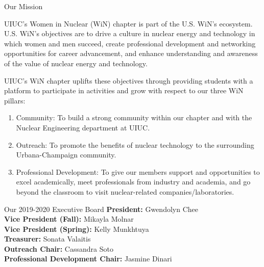\documentclass{resume2} %
\begin{document}
\begin{rSection}{Our Mission}
\raggedright
UIUC's Women in Nuclear (WiN) chapter is part of the
U.S. WiN's ecosystem. U.S. WiN's objectives are to
drive a culture in nuclear energy and technology
in which women and men succeed, create professional development
and networking opportunities for career advancement, and enhance understanding
and awareness of the value of nuclear energy and technology.

UIUC's WiN chapter uplifts these objectives through
providing students with a platform to participate
in activities and grow with respect to our three WiN
pillars:

\begin{enumerate}
	\item Community: To build a strong community within our chapter and
	with the Nuclear Engineering department at UIUC.
	\item Outreach: To promote the benefits of nuclear technology to the surrounding
	Urbana-Champaign community.
	\item Professional Development: To give our members support and opportunities to excel
	academically, meet professionals from industry and academia, and go beyond the classroom
	to visit nuclear-related companies/laboratories.
\end{enumerate}

\end{rSection}

\begin{rSection}{Our 2019-2020 Executive Board}
	\textbf{President:} Gwendolyn Chee  \\
	\textbf{Vice President (Fall):} Mikayla Molnar \\
	\textbf{Vice President (Spring):} Kelly Munkhtuya \\
	\textbf{Treasurer:} Sonata Valaitis \\
	\textbf{Outreach Chair:} Cassandra Soto \\
	\textbf{Professional Development Chair:} Jasmine Dinari
\end{rSection}
\end{document}
